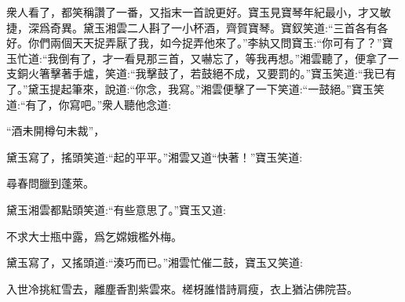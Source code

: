 \begin{parag}
    衆人看了，都笑稱讚了一番，又指末一首說更好。寶玉見寶琴年紀最小，才又敏捷，深爲奇異。黛玉湘雲二人斟了一小杯酒，齊賀寶琴。寶釵笑道:“三首各有各好。你們兩個天天捉弄厭了我，如今捉弄他來了。”李紈又問寶玉:“你可有了？”寶玉忙道:“我倒有了，才一看見那三首，又嚇忘了，等我再想。”湘雲聽了，便拿了一支銅火箸擊著手爐，笑道:“我擊鼓了，若鼓絕不成，又要罰的。”寶玉笑道:“我已有了。”黛玉提起筆來，說道:“你念，我寫。”湘雲便擊了一下笑道:“一鼓絕。”寶玉笑道:“有了，你寫吧。”衆人聽他念道:
\end{parag}

\begin{poem}
    \begin{pl}
        “酒未開樽句未裁”，
    \end{pl}
\end{poem}


\begin{parag}
    黛玉寫了，搖頭笑道:“起的平平。”湘雲又道“快著！”寶玉笑道:
\end{parag}


\begin{poem}
    \begin{pl} 尋春問臘到蓬萊。\end{pl}
\end{poem}

\begin{parag}
    黛玉湘雲都點頭笑道:“有些意思了。”寶玉又道:
\end{parag}


\begin{poem}
    \begin{pl}
        不求大士瓶中露，爲乞嫦娥檻外梅。
    \end{pl}
\end{poem}


\begin{parag}
    黛玉寫了，又搖頭道:“湊巧而已。”湘雲忙催二鼓，寶玉又笑道:
\end{parag}


\begin{poem}
    \begin{pl}入世冷挑紅雪去，離塵香割紫雲來。槎枒誰惜詩肩瘦，衣上猶沾佛院苔。\end{pl}
\end{poem}


